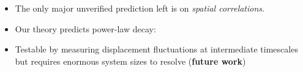 \begin{frame}[c]
\begin{columns}[T]
\begin{column}{0.55\linewidth}
\begin{itemize}
    \item<1-> The only major unverified prediction left is on \textit{spatial correlations}. 
    \item<3-> Our theory predicts power-law decay:
    \item<6-> Testable by measuring displacement fluctuations at intermediate timescales but requires enormous system sizes to resolve (\textbf{future work})
\end{itemize}

\end{column}

\end{columns}

\end{frame}